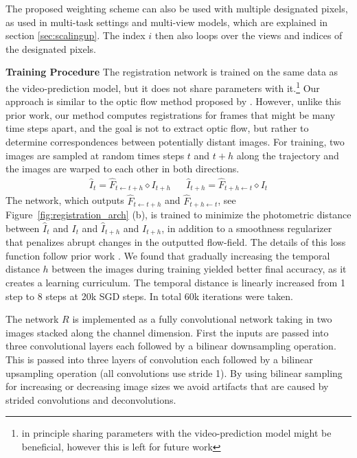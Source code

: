 The proposed weighting scheme can also be used with multiple designated pixels, as used in multi-task settings and multi-view models, which are explained in section \ref{sec:scalingup}. The index $i$ then also loops over the views and indices of the designated pixels.

\textbf{Training Procedure}
The registration network is trained on the same data as the video-prediction model, but it does not share parameters with it.\footnote{in principle sharing parameters with the video-prediction model might be beneficial, however this is left for future work} Our approach is similar to the optic flow method proposed by \cite{meister2017unflow}. However, unlike this prior work, our method computes registrations for frames that might be many time steps apart, and the goal is not to extract optic flow, but rather to determine correspondences between potentially distant images. For training, two images are sampled at random times steps $t$ and $t+h$ along the trajectory and the images are warped to each other in both directions. 
\begin{align}
\hat{I}_{t} = \hat{F}_{t \leftarrow t +h} \diamond  I_{t+h} &&
\hat{I}_{t+h} = \hat{F}_{t+h \leftarrow t} \diamond  I_{t}
\end{align}
The network, which outputs $\hat{F}_{t \leftarrow t +h}$ and $\hat{F}_{t+h \leftarrow t}$, see Figure~\ref{fig:registration_arch} (b), is trained to minimize the photometric distance between $\hat{I}_t$ and $I_t$ and $\hat{I}_{t+h}$ and $I_{t+h}$, in addition to a smoothness regularizer that penalizes abrupt changes in the outputted flow-field. The details of this loss function follow prior work \cite{meister2017unflow}. We found that gradually increasing the temporal distance $h$ between the images during training yielded better final accuracy, as it creates a learning curriculum. The temporal distance is linearly increased from 1 step to 8 steps at 20k SGD steps. In total 60k iterations were taken.

The network $R$ is implemented as a fully convolutional network taking in two images stacked along the channel dimension. First the inputs are passed into three convolutional layers each followed by a bilinear downsampling operation. This is passed into three layers of convolution each followed by a bilinear upsampling operation (all convolutions use stride 1). By using bilinear sampling for increasing or decreasing image sizes we avoid artifacts that are caused by strided convolutions and deconvolutions.


